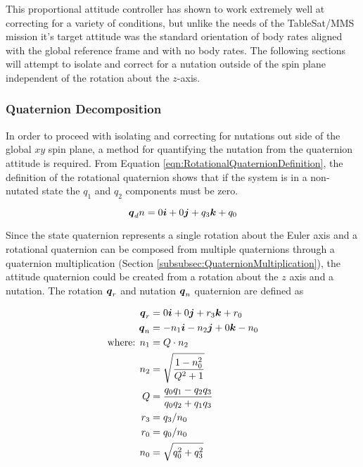 This proportional attitude controller has shown to work extremely well at correcting for a variety of conditions, but unlike the needs of the TableSat/MMS mission it's target attitude was the standard orientation of body rates aligned with the global reference frame and with no body rates.  The following sections will attempt to isolate and correct for a nutation outside of the spin plane independent of the rotation about the $z$-axis.

\subsubsection{Quaternion Decomposition}
\label{subsec:QuaternionDecomposition}

In order to proceed with isolating and correcting for nutations out side of the global $xy$ spin plane, a method for quantifying the nutation from the quaternion attitude is required.  From Equation \ref{eqn:RotationalQuaternionDefinition}, the definition of the rotational quaternion shows that if the system is in a non-nutated state the $q_1$ and $q_2$ components must be zero.

\begin{equation}
  \boldsymbol{q}_dn = 0 \boldsymbol{i} + 0 \boldsymbol{j} +q_3 \boldsymbol{k} + q_0
  \label{eqn:NutationDesiredQuaternion}
\end{equation}

Since the state quaternion represents a single rotation about the Euler axis and a rotational quaternion can be composed from multiple quaternions through a quaternion multiplication (Section \ref{subsubsec:QuaternionMultiplication}), the attitude quaternion could be created from a rotation about the $z$ axis and a nutation.  The rotation $\boldsymbol{q}_r$ and nutation $\boldsymbol{q}_n$ quaternion are defined as

\begin{subequations}
  \begin{align}
    \boldsymbol{q}_r &= 0 \boldsymbol{i} + 0 \boldsymbol{j} + r_3 \boldsymbol{k} + r_0\\
    \boldsymbol{q}_n &= -n_1 \boldsymbol{i} - n_2 \boldsymbol{j} + 0 \boldsymbol{k} - n_0 \\
    \text{where: } n_1 &= Q \cdot n_2 \\
    n_2 &= \sqrt{\frac{1 - n_0^2}{Q^2 + 1}} \\
    Q &= \frac{q_0 q_1 - q_2 q_3}{q_0 q_2 + q_1 q_3} \\
    r_3 &= q_3 / n_0 \\
    r_0 &= q_0 / n_0 \\
    n_0 &= \sqrt{q_0^2 + q_3^2}
  \end{align}
  \label{eqn:DecomposeQuaternion}
\end{subequations}

